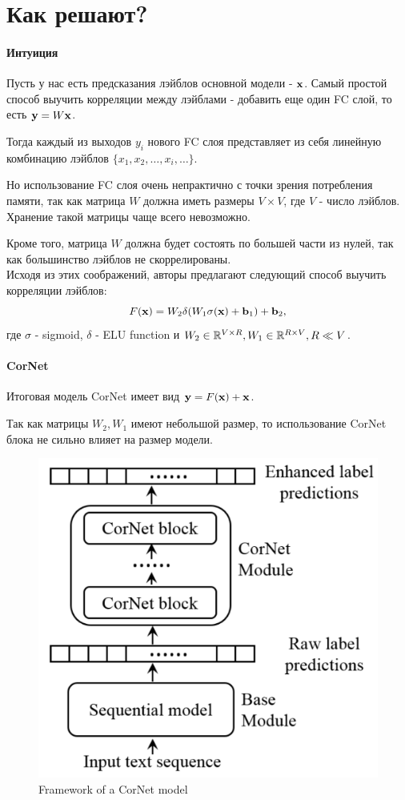 \section*{Как решают?}

\paragraph{Интуиция} Пусть у нас есть предсказания лэйблов основной модели - ${\bf x}$. Самый простой способ выучить корреляции между лэйблами - добавить еще один FC слой, то есть ${\bf y} = W {\bf x}$.

Тогда каждый из выходов $y_i$ нового FC слоя представляет из себя линейную комбинацию лэйблов $\{x_1, x_2, \ldots, x_i, \ldots\}$.

Но использование FC слоя очень непрактично с точки зрения потребления памяти, так как матрица $W$ должна иметь размеры $V\times V$, где $V$ - число лэйблов. Хранение такой матрицы чаще всего невозможно.

Кроме того, матрица $W$ должна будет состоять по большей части из нулей, так как большинство лэйблов не скоррелированы. \\

Исходя из этих соображений, авторы предлагают следующий способ выучить корреляции лэйблов:
\begin{equation*}
    F({\bf x}) = W_2 \delta (W_1 \sigma({\bf x}) + {\bf b}_1) + {\bf b}_2,
\end{equation*}
где $\sigma$ - sigmoid, $\delta$ - ELU function и $W_2 \in \mathbb{R}^{V \times R}, W_1 \in \mathbb{R}^{R \times V}, R \ll V$.

\paragraph{CorNet}

Итоговая модель CorNet имеет вид ${\bf y} = F({\bf x}) + {\bf x}$. 

Так как матрицы $W_2, W_1$ имеют небольшой размер, то использование CorNet блока не сильно влияет на размер модели. \\

\begin{figure}
    \includegraphics[width=0.7\linewidth]{images/cornet.png}
    \caption{\footnotesize{Framework of a CorNet model}}
    \label{fig:cornet}
\end{figure}

